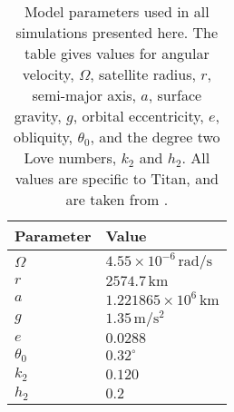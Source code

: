 \begin{table}[!t]
\centering
\begin{tabularx}{\linewidth}{p{3.5cm} p{3cm}}
 \toprule
Parameter & Value\\
 \midrule \midrule
$\Omega$ & $4.55 \times 10^{-6} \, \si{\radian\per\second}$\\
$r$ & $2574.7 \, \si{\kilo\metre}$\\
$a$ & $1.221865 \times 10^6 \, \si{\kilo\metre}$\\
$g$ & $1.35 \, \si{\metre\per\second\squared}$\\
$e$ & $0.0288$\\
$\theta_0$ & $0.32^{\circ}$\\
$k_2$ & $0.120$\\
$h_2$ & $0.2$\\
 \bottomrule
\end{tabularx}
\caption{Model parameters used in all simulations presented here. The table gives values for angular velocity, $\Omega$, satellite radius, $r$, semi-major axis, $a$, surface gravity, $g$, orbital eccentricity, $e$, obliquity, $\theta_0$, and the degree two Love numbers, $k_2$ and $h_2$. All values are specific to Titan, and are taken from \citet{zebker2009size,chen2013tidal}.  \label{tb:param}}
\end{table}
